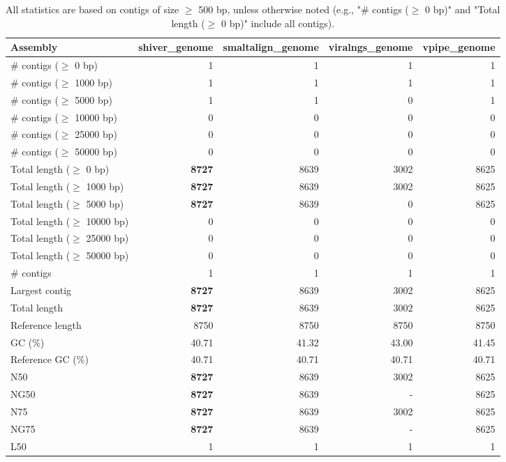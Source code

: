 \documentclass[12pt,a4paper]{article}
\begin{document}
\begin{table}[ht]
\begin{center}
\caption{All statistics are based on contigs of size $\geq$ 500 bp, unless otherwise noted (e.g., "\# contigs ($\geq$ 0 bp)" and "Total length ($\geq$ 0 bp)" include all contigs).}
\begin{tabular}{|l*{4}{|r}|}
\hline
Assembly & shiver\_genome & smaltalign\_genome & viralngs\_genome & vpipe\_genome \\ \hline
\# contigs ($\geq$ 0 bp) & 1 & 1 & 1 & 1 \\ \hline
\# contigs ($\geq$ 1000 bp) & 1 & 1 & 1 & 1 \\ \hline
\# contigs ($\geq$ 5000 bp) & 1 & 1 & 0 & 1 \\ \hline
\# contigs ($\geq$ 10000 bp) & 0 & 0 & 0 & 0 \\ \hline
\# contigs ($\geq$ 25000 bp) & 0 & 0 & 0 & 0 \\ \hline
\# contigs ($\geq$ 50000 bp) & 0 & 0 & 0 & 0 \\ \hline
Total length ($\geq$ 0 bp) & {\bf 8727} & 8639 & 3002 & 8625 \\ \hline
Total length ($\geq$ 1000 bp) & {\bf 8727} & 8639 & 3002 & 8625 \\ \hline
Total length ($\geq$ 5000 bp) & {\bf 8727} & 8639 & 0 & 8625 \\ \hline
Total length ($\geq$ 10000 bp) & 0 & 0 & 0 & 0 \\ \hline
Total length ($\geq$ 25000 bp) & 0 & 0 & 0 & 0 \\ \hline
Total length ($\geq$ 50000 bp) & 0 & 0 & 0 & 0 \\ \hline
\# contigs & 1 & 1 & 1 & 1 \\ \hline
Largest contig & {\bf 8727} & 8639 & 3002 & 8625 \\ \hline
Total length & {\bf 8727} & 8639 & 3002 & 8625 \\ \hline
Reference length & 8750 & 8750 & 8750 & 8750 \\ \hline
GC (\%) & 40.71 & 41.32 & 43.00 & 41.45 \\ \hline
Reference GC (\%) & 40.71 & 40.71 & 40.71 & 40.71 \\ \hline
N50 & {\bf 8727} & 8639 & 3002 & 8625 \\ \hline
NG50 & {\bf 8727} & 8639 & - & 8625 \\ \hline
N75 & {\bf 8727} & 8639 & 3002 & 8625 \\ \hline
NG75 & {\bf 8727} & 8639 & - & 8625 \\ \hline
L50 & 1 & 1 & 1 & 1 \\ \hline

\end{tabular}
\end{center}
\end{table}
\end{document}
